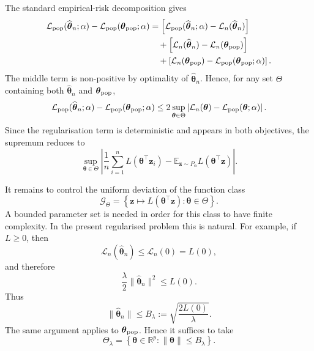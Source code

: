 \documentclass[11pt]{article}
\newcommand{\RR}{\mathbb{R}}
\newcommand{\EE}{\mathbb{E}}
\newcommand{\btheta}{\boldsymbol{\theta}}
\begin{document}
The standard empirical-risk decomposition gives
\[
\begin{aligned}
\mathcal L_{\rm pop}(\widehat{\btheta}_n;\alpha)
-
\mathcal L_{\rm pop}(\btheta_{\rm pop};\alpha)
&=
\left[
\mathcal L_{\rm pop}(\widehat{\btheta}_n;\alpha)
-
\mathcal L_n(\widehat{\btheta}_n)
\right]
\\
&\quad+
\left[
\mathcal L_n(\widehat{\btheta}_n)
-
\mathcal L_n(\btheta_{\rm pop})
\right]
\\
&\quad+
\left[
\mathcal L_n(\btheta_{\rm pop})
-
\mathcal L_{\rm pop}(\btheta_{\rm pop};\alpha)
\right].
\end{aligned}
\]
The middle term is non-positive by optimality of \(\widehat{\btheta}_n\). Hence, for any set
\(\Theta\) containing both \(\widehat{\btheta}_n\) and \(\btheta_{\rm pop}\),
\[
\mathcal L_{\rm pop}(\widehat{\btheta}_n;\alpha)
-
\mathcal L_{\rm pop}(\btheta_{\rm pop};\alpha)
\leq
2
\sup_{\btheta\in\Theta}
\left|
\mathcal L_n(\btheta)
-
\mathcal L_{\rm pop}(\btheta;\alpha)
\right|.
\]
Since the regularisation term is deterministic and appears in both objectives, the supremum reduces to
\[
\sup_{\btheta\in\Theta}
\left|
\frac1n\sum_{i=1}^n L(\btheta^\top \mathbf{z}_i)
-
\EE_{\mathbf{z}\sim P_\alpha}
L(\btheta^\top \mathbf{z})
\right|.
\]

It remains to control the uniform deviation of the function class
\[
\mathcal G_\Theta
=
\left\{
\mathbf{z}\mapsto L(\btheta^\top \mathbf{z})
:
\btheta\in\Theta
\right\}.
\]
A bounded parameter set is needed in order for this class to have finite complexity. In the present regularised problem this is natural. For example, if \(L\geq 0\), then
\[
\mathcal L_n(\widehat{\btheta}_n)
\leq
\mathcal L_n(0)
=
L(0),
\]
and therefore
\[
\frac{\lambda}{2}\|\widehat{\btheta}_n\|^2
\leq
L(0).
\]
Thus
\[
\|\widehat{\btheta}_n\|
\leq
B_\lambda
:=
\sqrt{\frac{2L(0)}{\lambda}}.
\]
The same argument applies to \(\btheta_{\rm pop}\). Hence it suffices to take
\[
\Theta_\lambda
=
\left\{
\btheta\in\RR^p:
\|\btheta\|\leq B_\lambda
\right\}.
\]
\end{document}
